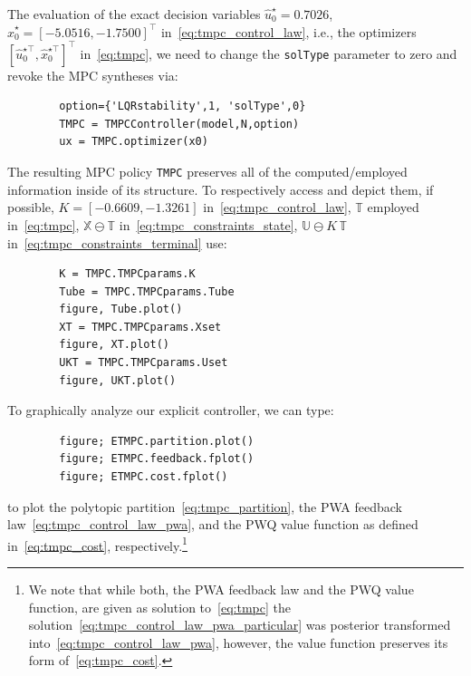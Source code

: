 \documentclass[letterpaper, 10 pt, conference]{ieeeconf}
\begin{document}
	
	The evaluation of the exact decision variables $\hat{u}_{0}^{\star} = 0.7026$, $\hat{x}_{0}^{\star} = [-5.0516, -1.7500]^{\top}$ in~\eqref{eq:tmpc_control_law}, i.e., the optimizers $\left[ \hat{u}_{0}^{\star\top}, \hat{x}_{0}^{\star\top} \right]^{\top}$ in~\eqref{eq:tmpc}, we need to change the \texttt{solType} parameter to zero and revoke the MPC syntheses via:
	\begin{verbatim}
		option={'LQRstability',1, 'solType',0}
		TMPC = TMPCController(model,N,option)
		ux = TMPC.optimizer(x0)
	\end{verbatim}
	The resulting MPC policy \texttt{TMPC} preserves all of the computed/employed information inside of its structure. To respectively access and depict them, if possible, $K = [-0.6609, -1.3261]$ in~\eqref{eq:tmpc_control_law}, $\mathbb{T}$ employed in~\eqref{eq:tmpc}, $\mathbb{X} \ominus \mathbb{T}$ in~\eqref{eq:tmpc_constraints_state}, $\mathbb{U} \ominus K \, \mathbb{T}$ in~\eqref{eq:tmpc_constraints_terminal} use:
	\begin{verbatim}
		K = TMPC.TMPCparams.K
		Tube = TMPC.TMPCparams.Tube
		figure, Tube.plot()
		XT = TMPC.TMPCparams.Xset
		figure, XT.plot()
		UKT = TMPC.TMPCparams.Uset
		figure, UKT.plot()
	\end{verbatim}
	
	To graphically analyze our explicit controller, we can type:
	\begin{verbatim}
		figure; ETMPC.partition.plot()
		figure; ETMPC.feedback.fplot()
		figure; ETMPC.cost.fplot()
	\end{verbatim}
	to plot the polytopic partition~\eqref{eq:tmpc_partition}, the PWA feedback law~\eqref{eq:tmpc_control_law_pwa}, and the PWQ value function as defined in~\eqref{eq:tmpc_cost}, respectively.\footnote{We note that while both, the PWA feedback law and the PWQ value function, are given as solution to~\eqref{eq:tmpc} the solution~\eqref{eq:tmpc_control_law_pwa_particular} was posterior transformed into~\eqref{eq:tmpc_control_law_pwa}, however, the value function preserves its form of~\eqref{eq:tmpc_cost}.}
	
\end{document}
